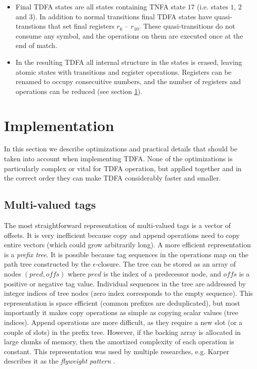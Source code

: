 \documentclass[]{article}
\begin{document}
\begin{itemize}
\item[\ding{212}]
Final TDFA states are all states containing TNFA state $17$ (i.e. states $1$, $2$ and $3$).
In addition to normal transitions final TDFA states have quasi-transtions
that set final registers $r_6$ -- $r_{10}$.
These quasi-transitions do not consume any symbol, and the operations on them are executed once at the end of match.
\medskip

\item[\ding{212}]
In the resulting TDFA all internal structure in the states is erased,
leaving atomic states with transitions and register operations.
Registers can be renamed to occupy consecuitive numbers,
and the number of registers and operations can be reduced (see section \ref{section_impl}).
\medskip

\end{itemize}

\FloatBarrier

\section{Implementation}\label{section_impl}

In this section we describe optimizations and practical details that should be taken into account when implementing TDFA.
None of the optimizations is particularly complex or vital for TDFA operation,
but applied together and in the correct order they can make TDFA considerably faster and smaller.

\subsection{Multi-valued tags}

The most straightforward representation of multi-valued tags is a vector of offsets.
It is very inefficient because copy and append operations need to copy entire vectors (which could grow arbitrarily long).
A more efficient representation is a \emph{prefix tree}.
It is possible because tag sequences in the operations map on the path tree constructed by the $\epsilon$-closure.
The tree can be stored as an array of nodes $(pred, o\!f\!\!f\!s)$ where
$pred$ is the index of a predecessor node, and $o\!f\!\!f\!s$ is a positive or negative tag value.
Individual sequences in the tree are addressed by integer indices of tree nodes
(zero index corresponds to the empty sequence).
%
This representation is space efficient (common prefixes are deduplicated),
but most importantly it makes copy operations as simple as copying scalar values (tree indices).
Append operations are more difficult, as they require a new slot (or a couple of slots) in the prefix tree.
However, if the backing array is allocated in large chunks of memory,
then the amortized complexity of each operation is constant.
%
This representation was used by multiple researches,
e.g. Karper describes it as the \emph{flyweight pattern} \cite{Kar14}.
\end{document}
